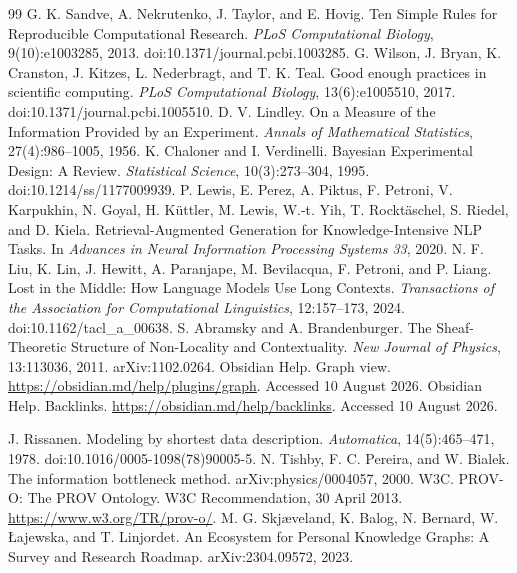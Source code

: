\begin{thebibliography}{99}
 G. K. Sandve, A. Nekrutenko, J. Taylor, and E. Hovig. Ten Simple Rules for Reproducible Computational Research. \emph{PLoS Computational Biology}, 9(10):e1003285, 2013. doi:10.1371/journal.pcbi.1003285.
 G. Wilson, J. Bryan, K. Cranston, J. Kitzes, L. Nederbragt, and T. K. Teal. Good enough practices in scientific computing. \emph{PLoS Computational Biology}, 13(6):e1005510, 2017. doi:10.1371/journal.pcbi.1005510.
 D. V. Lindley. On a Measure of the Information Provided by an Experiment. \emph{Annals of Mathematical Statistics}, 27(4):986--1005, 1956.
 K. Chaloner and I. Verdinelli. Bayesian Experimental Design: A Review. \emph{Statistical Science}, 10(3):273--304, 1995. doi:10.1214/ss/1177009939.
 P. Lewis, E. Perez, A. Piktus, F. Petroni, V. Karpukhin, N. Goyal, H. K\"uttler, M. Lewis, W.-t. Yih, T. Rockt\"aschel, S. Riedel, and D. Kiela. Retrieval-Augmented Generation for Knowledge-Intensive NLP Tasks. In \emph{Advances in Neural Information Processing Systems 33}, 2020.
 N. F. Liu, K. Lin, J. Hewitt, A. Paranjape, M. Bevilacqua, F. Petroni, and P. Liang. Lost in the Middle: How Language Models Use Long Contexts. \emph{Transactions of the Association for Computational Linguistics}, 12:157--173, 2024. doi:10.1162/tacl\_a\_00638.
 S. Abramsky and A. Brandenburger. The Sheaf-Theoretic Structure of Non-Locality and Contextuality. \emph{New Journal of Physics}, 13:113036, 2011. arXiv:1102.0264.
 Obsidian Help. Graph view. \url{https://obsidian.md/help/plugins/graph}. Accessed 10 August 2026.
 Obsidian Help. Backlinks. \url{https://obsidian.md/help/backlinks}. Accessed 10 August 2026.

 J. Rissanen. Modeling by shortest data description. \emph{Automatica}, 14(5):465--471, 1978. doi:10.1016/0005-1098(78)90005-5.
 N. Tishby, F. C. Pereira, and W. Bialek. The information bottleneck method. arXiv:physics/0004057, 2000.
 W3C. PROV-O: The PROV Ontology. W3C Recommendation, 30 April 2013. \url{https://www.w3.org/TR/prov-o/}.
 M. G. Skj\ae veland, K. Balog, N. Bernard, W. \L ajewska, and T. Linjordet. An Ecosystem for Personal Knowledge Graphs: A Survey and Research Roadmap. arXiv:2304.09572, 2023.



\end{thebibliography}
